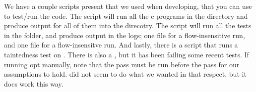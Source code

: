 We have a couple scripts present that we used when developing, that you can use
to test/run the code.  The script  will run all the c programs
in the  directory and produce output for all of them into the
 direcotry. The script  will run all the
 tests in the  folder, and produce output in the
logs; one file for a flow-insensitive run, and one file for a flow-insensitve
run. And lastly, there is a  script that runs a taintedness
test on . There is also a
, but it has been failing some recent tests.
If running opt manually, note that the  pass must be run before the
 pass for our assumptions to hold.  did not seem
to do what we wanted in that respect, but it does work this way. 


\newpage




